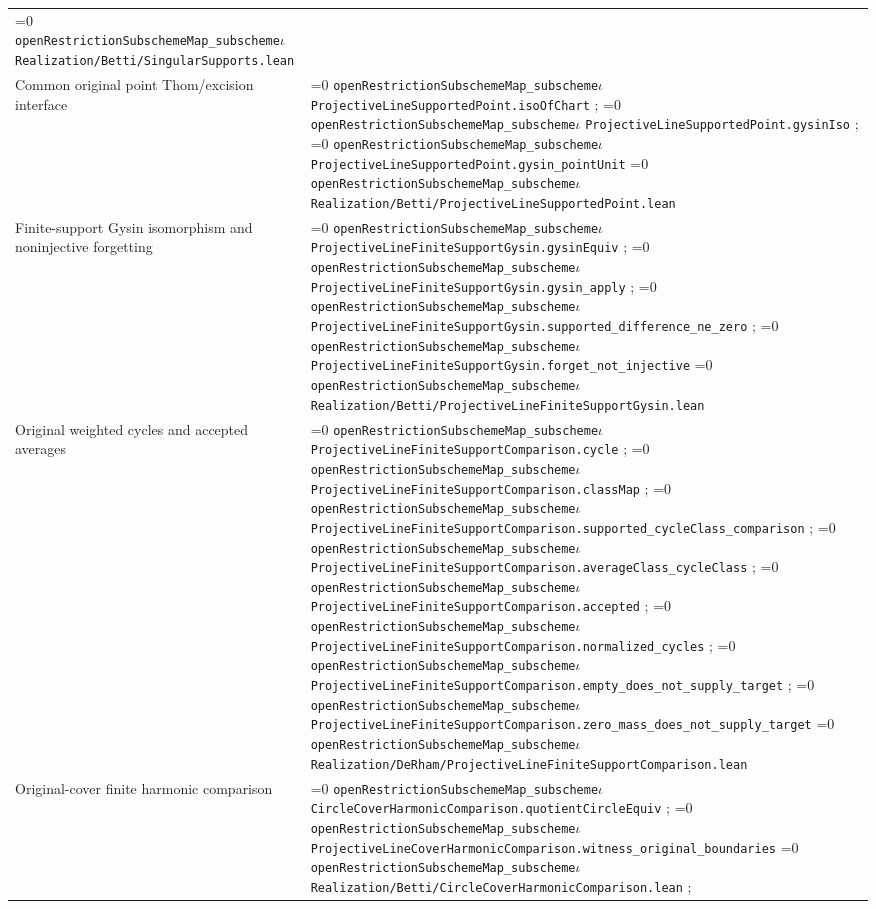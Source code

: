 \documentclass[11pt]{article}
\theoremstyle{definition}
\theoremstyle{remark}
\newcommand{\leanpath}[1]{%
  \ifnum\pdfstrcmp{\detokenize{#1}}%
      {\detokenize{openRestrictionSubschemeMap_subschemeι}}=0
    \texttt{\nolinkurl{openRestrictionSubschemeMap_subscheme}}\ensuremath{\iota}%
  \else
    \texttt{\nolinkurl{#1}}%
  \fi}
\begin{document}
\begin{longtable}{@{}>{\raggedright\arraybackslash}p{}
                >{\raggedright\arraybackslash}p{}@{}}
\leanpath{Realization/Betti/SingularSupports.lean}\\
Common original point Thom/excision interface &
\leanpath{ProjectiveLineSupportedPoint.isoOfChart};\newline
\leanpath{ProjectiveLineSupportedPoint.gysinIso};\newline
\leanpath{ProjectiveLineSupportedPoint.gysin_pointUnit}\newline
\leanpath{Realization/Betti/ProjectiveLineSupportedPoint.lean}\\
Finite-support Gysin isomorphism and noninjective forgetting &
\leanpath{ProjectiveLineFiniteSupportGysin.gysinEquiv};\newline
\leanpath{ProjectiveLineFiniteSupportGysin.gysin_apply};\newline
{\footnotesize\leanpath{ProjectiveLineFiniteSupportGysin.supported_difference_ne_zero}};\newline
\leanpath{ProjectiveLineFiniteSupportGysin.forget_not_injective}\newline
\leanpath{Realization/Betti/ProjectiveLineFiniteSupportGysin.lean}\\
Original weighted cycles and accepted averages &
\leanpath{ProjectiveLineFiniteSupportComparison.cycle};\newline
\leanpath{ProjectiveLineFiniteSupportComparison.classMap};\newline
{\scriptsize\leanpath{ProjectiveLineFiniteSupportComparison.supported_cycleClass_comparison}};\newline
{\footnotesize\leanpath{ProjectiveLineFiniteSupportComparison.averageClass_cycleClass}};\newline
\leanpath{ProjectiveLineFiniteSupportComparison.accepted};\newline
\leanpath{ProjectiveLineFiniteSupportComparison.normalized_cycles};\newline
{\footnotesize\leanpath{ProjectiveLineFiniteSupportComparison.empty_does_not_supply_target}};\newline
{\scriptsize\leanpath{ProjectiveLineFiniteSupportComparison.zero_mass_does_not_supply_target}}\newline
{\footnotesize\leanpath{Realization/DeRham/ProjectiveLineFiniteSupportComparison.lean}}\\
Original-cover finite harmonic comparison &
\leanpath{CircleCoverHarmonicComparison.quotientCircleEquiv};
\leanpath{ProjectiveLineCoverHarmonicComparison.witness_original_boundaries}\newline
\leanpath{Realization/Betti/CircleCoverHarmonicComparison.lean};

\end{longtable}
\end{document}
